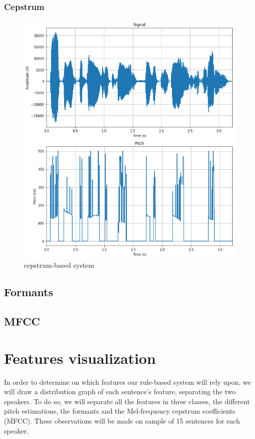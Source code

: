 \documentclass[]{article}
\begin{document}
\subsubsection{Cepstrum}

\begin{figure}[H]
    \centering
    \includegraphics[scale=0.5]{images/cepstrum_pitch.png}
    \caption{\label{cepstrum}cepstrum-based system}
\end{figure}

\subsection{Formants}


\subsection{MFCC}

\section{Features visualization}

In order to determine on which features our rule-based system will rely upon, we will draw a
distribution graph of each sentence's feature, separating the two speakers. To do so, we will separate all
the features in three classes, the different pitch estimations, the formants and
the Mel-frequency cepstrum coefficients (MFCC). These observations will be made on sample of
15 sentences for each speaker.
\end{document}
